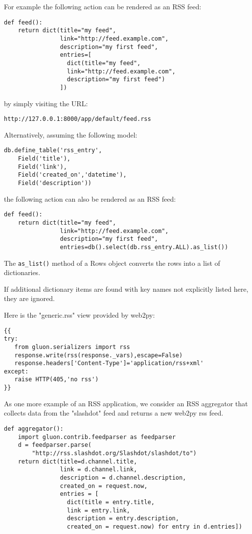 \documentclass[justified,sixbynine,notoc]{tufte-book}
\def\ft{\small\tt}
\begin{document}
\begin{fullwidth}
For example the following action can be rendered as an RSS feed:
\begin{lstlisting}
def feed():
    return dict(title="my feed",
                link="http://feed.example.com",
                description="my first feed",
                entries=[
                  dict(title="my feed",
                  link="http://feed.example.com",
                  description="my first feed")
                ])
\end{lstlisting}
\noindent by simply visiting the URL:

\begin{lstlisting}[keywords={}]
http://127.0.0.1:8000/app/default/feed.rss
\end{lstlisting}

Alternatively, assuming the following model:
\begin{lstlisting}
db.define_table('rss_entry',
    Field('title'),
    Field('link'),
    Field('created_on','datetime'),
    Field('description'))
\end{lstlisting}
\noindent the following action can also be rendered as an RSS feed:

\begin{lstlisting}
def feed():
    return dict(title="my feed",
                link="http://feed.example.com",
                description="my first feed",
                entries=db().select(db.rss_entry.ALL).as_list())
\end{lstlisting}

The {\ft as\_list()} method of a Rows object converts the rows into a list of dictionaries.

If additional dictionary items are found with key names not explicitly listed here, they are ignored.

Here is the "generic.rss" view provided by web2py:
\begin{lstlisting}[keywords={}]
{{
try:
   from gluon.serializers import rss
   response.write(rss(response._vars),escape=False)
   response.headers['Content-Type']='application/rss+xml'
except:
   raise HTTP(405,'no rss')
}}
\end{lstlisting}

As one more example of an RSS application, we consider an RSS aggregator that collects data from the "slashdot" feed and returns a new web2py rss feed.
\begin{lstlisting}
def aggregator():
    import gluon.contrib.feedparser as feedparser
    d = feedparser.parse(
        "http://rss.slashdot.org/Slashdot/slashdot/to")
    return dict(title=d.channel.title,
                link = d.channel.link,
                description = d.channel.description,
                created_on = request.now,
                entries = [
                  dict(title = entry.title,
                  link = entry.link,
                  description = entry.description,
                  created_on = request.now) for entry in d.entries])
\end{lstlisting}


\end{fullwidth}
\end{document}

